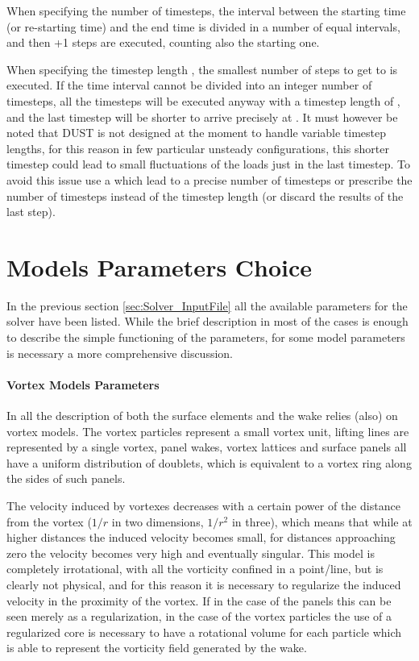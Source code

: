 When specifying the number of timesteps, the interval between the 
starting time (or re-starting time) and the end time is divided in 
a number  of equal intervals, and then +1 
steps are executed, counting also the starting one.

When specifying the timestep length , the smallest number of 
steps to get to  is executed. If the time interval cannot be 
divided into an integer number of timesteps, all the timesteps will be 
executed anyway with a timestep length of , and the last timestep 
will be shorter to arrive precisely at . It must however be 
noted that DUST is not designed at the moment to handle variable timestep 
lengths, for this reason in few particular unsteady configurations, this 
shorter timestep could lead to small fluctuations of the loads just in the 
last timestep. To avoid this issue use a  which lead to a precise 
number of timesteps or prescribe the number of timesteps instead of the 
timestep length (or discard the results of the last step). 

\section{Models Parameters Choice}
\label{sec:Solver_ParametersChoice}
In the previous section \ref{sec:Solver_InputFile} all the available 
parameters for the \DUST{} solver have been listed. While the brief 
description in most of the cases is enough to describe the simple 
functioning of the parameters, for some model parameters is necessary 
a more comprehensive discussion. 

\paragraph{Vortex Models Parameters}

In \DUST{} all the description of both the surface elements and 
the wake relies (also) on vortex models. The vortex particles 
represent a small vortex unit, lifting lines are represented by 
a single vortex, panel wakes, vortex lattices and surface panels 
all have a uniform distribution of doublets, which is equivalent 
to a vortex ring along the sides of such panels. 

The velocity induced by vortexes decreases with a certain power 
of the distance from the vortex ($1/r$ in two dimensions, $1/r^2$ in three), 
which means that while at higher distances the induced velocity becomes 
small, for distances approaching zero the velocity becomes very high 
and eventually singular. This model is completely irrotational, with 
all the vorticity confined in a point/line, but is clearly not physical, 
and for this reason it is necessary to regularize the induced velocity 
in the proximity of the vortex. If in the case of the panels this can 
be seen merely as a regularization, in the case of the vortex particles 
the use of a regularized core is necessary to have a rotational volume 
for each particle which is able to represent the vorticity field generated 
by the wake. 

